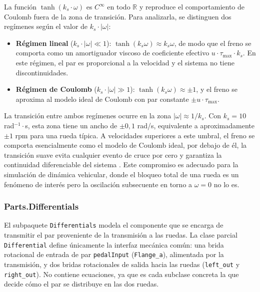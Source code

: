 La función $\tanh(k_s \cdot \omega)$ es $C^\infty$ en todo $\mathbb{R}$ y reproduce el comportamiento de Coulomb fuera de la zona de transición. Para analizarla, se distinguen dos regímenes según el valor de $k_s \cdot |\omega|$:

\begin{itemize}
	\item \textbf{Régimen lineal} ($k_s \cdot |\omega| \ll 1$): $\tanh(k_s\omega) \approx k_s\omega$, de modo que el freno se comporta como un amortiguador viscoso de coeficiente efectivo $u \cdot \tau_\text{max} \cdot k_s$. En este régimen, el par es proporcional a la velocidad y el sistema no tiene discontinuidades.
	\item \textbf{Régimen de Coulomb} ($k_s \cdot |\omega| \gg 1$): $\tanh(k_s\omega) \approx \pm 1$, y el freno se aproxima al modelo ideal de Coulomb con par constante $\pm u \cdot \tau_\text{max}$.
\end{itemize}

La transición entre ambos regímenes ocurre en la zona $|\omega| \approx 1/k_s$. Con $k_s = 10$ rad$^{-1}{\cdot}$s, esta zona tiene un ancho de $\pm 0{,}1$ rad/s, equivalente a aproximadamente $\pm 1$ rpm para una rueda típica. A velocidades superiores a este umbral, el freno se comporta esencialmente como el modelo de Coulomb ideal, por debajo de él, la transición suave evita cualquier evento de cruce por cero y garantiza la continuidad diferenciable del sistema \cite{armstrong1994}. Este compromiso es adecuado para la simulación de dinámica vehicular, donde el bloqueo total de una rueda es un fenómeno de interés pero la oscilación subsecuente en torno a $\omega = 0$ no lo es.\\


\subsubsection*{Parts.Differentials}

El subpaquete \verb|Differentials| modela el componente que se encarga de transmitir el par proveniente de la transmisión a las ruedas. La clase parcial \verb|Differential| define únicamente la interfaz mecánica común: una brida rotacional de entrada de par \verb|pedalInput| (\verb|Flange_a|), alimentada por la transmisión, y dos bridas rotacionales de salida hacia las ruedas (\verb|left_out| y \verb|right_out|). No contiene ecuaciones, ya que es cada subclase concreta la que decide cómo el par se distribuye en las dos ruedas.\\

